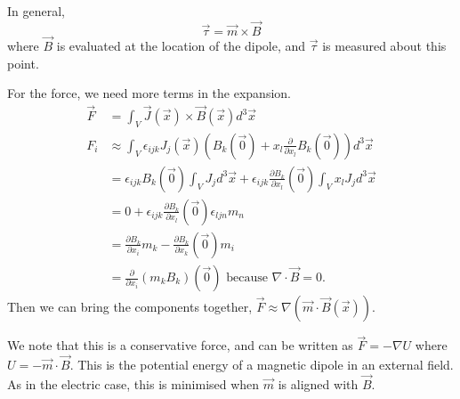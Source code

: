 \documentclass[../Main.tex]{subfiles}
\begin{document}
In general,
\begin{equation*}
    \vec{\tau} = \vec{m} \times \vec{B}
\end{equation*}
where $\vec{B}$ is evaluated at the location of the dipole, and $\vec{\tau}$ is measured about this point.

For the force, we need more terms in the expansion.
\begin{align*}
    \vec{F} &= \int_V \vec{J}(\vec{x}) \times \vec{B}(\vec{x}) d^3 \vec{x} \\
    F_i &\approx \int_V \epsilon_{ijk} J_j(\vec{x}) \left(B_k(\vec0) + x_l \frac{\partial}{\partial x_l} B_k(\vec0)\right) d^3\vec{x} \\
    &= \epsilon_{ijk} B_k(\vec0) \int_V J_j d^3\vec{x} + \epsilon_{ijk} \frac{\partial B_k}{\partial x_l}(\vec0) \int_V x_l J_j d^3\vec{x} \\
    &= 0 + \epsilon_{ijk} \frac{\partial B_k}{\partial x_l}(\vec0) \epsilon_{ljn} m_n \\
    &= \frac{\partial B_k}{\partial x_i} m_k - \frac{\partial B_k}{\partial x_k}(\vec0) m_i \\
    &= \frac{\partial}{\partial x_i} \left(m_k B_k\right)(\vec0) \text{ because $\nabla \cdot \vec{B} = 0$}.
\end{align*}
Then we can bring the components together, $\vec{F} \approx \nabla(\vec{m} \cdot \vec{B}(\vec{x}))$.

We note that this is a conservative force, and can be written as $\vec{F} = -\nabla U$ where $U = -\vec{m} \cdot \vec{B}$. This is the potential energy of a magnetic dipole in an external field. As in the electric case, this is minimised when $\vec{m}$ is aligned with $\vec{B}$.
\end{document}
